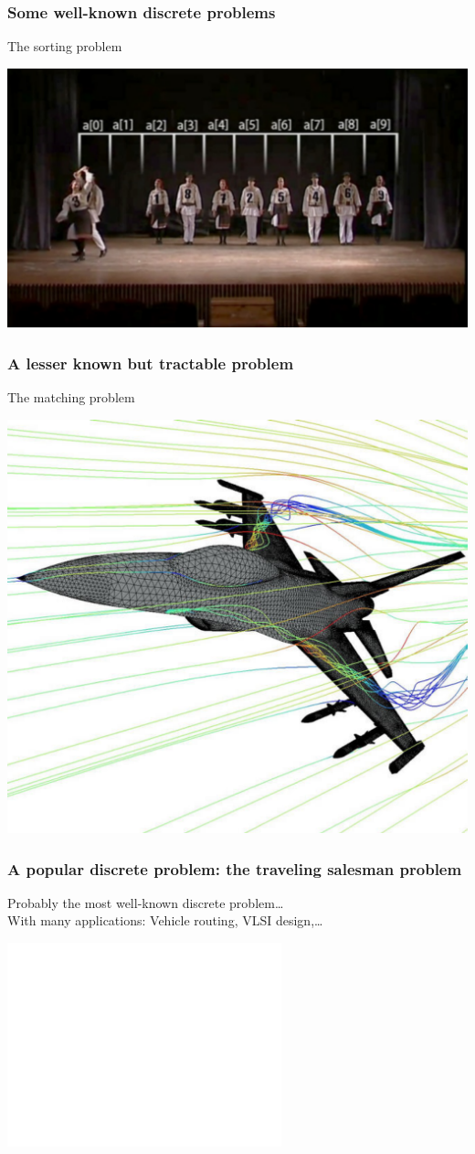 \documentclass[9pt,handout]{beamer}
\begin{document}
\begin{frame}
\frametitle{Some well-known discrete problems}
\begin{center}
The sorting problem
\end{center}
\begin{center}
\includegraphics[width=.7\linewidth]{Tri.pdf}
\end{center}
\end{frame}
\begin{frame}
\frametitle{A lesser known but tractable problem}
\begin{center}
The matching problem
\end{center}
\begin{center}
\includegraphics[width=.7\linewidth]{f16_stream.pdf}
\end{center}
\end{frame}
\begin{frame}
\frametitle{A popular discrete problem: the traveling salesman problem}
Probably the most well-known discrete problem\ldots\\
With many applications: Vehicle routing, VLSI design,\ldots\bigskip

\begin{overlayarea}{\linewidth}{5.93cm}
\begin{center}
\includegraphics<4>[height=5.9cm]{europa-l.pdf}
\end{center}
\end{overlayarea}
\end{frame}
\end{document}
